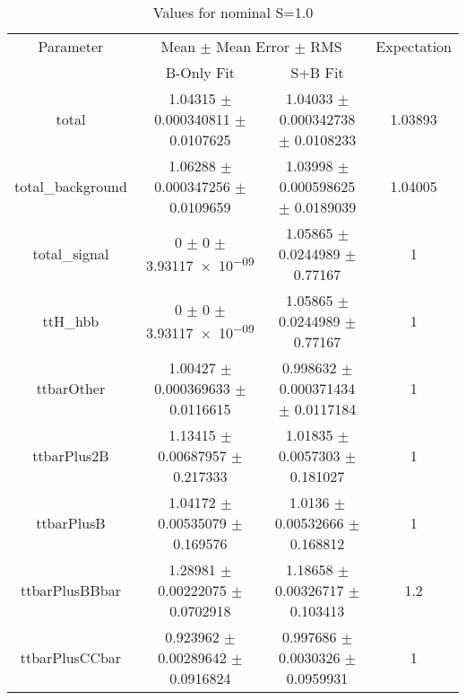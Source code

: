 \begin{table}
\centering
\caption{Values for nominal S=1.0}
\begin{tabular}{cccc}
\toprule
Parameter & \multicolumn{2}{c}{Mean $\pm$ Mean Error $\pm$ RMS} & Expectation\\
 & B-Only Fit & S+B Fit & \\
\midrule
total & \num{1.04315} $\pm$ \num{0.000340811} $\pm$ \num{0.0107625} & \num{1.04033} $\pm$ \num{0.000342738} $\pm$ \num{0.0108233} & \num{1.03893}\\
total\_background & \num{1.06288} $\pm$ \num{0.000347256} $\pm$ \num{0.0109659} & \num{1.03998} $\pm$ \num{0.000598625} $\pm$ \num{0.0189039} & \num{1.04005}\\
total\_signal & \num{0} $\pm$ \num{0} $\pm$ \num{3.93117e-09} & \num{1.05865} $\pm$ \num{0.0244989} $\pm$ \num{0.77167} & \num{1}\\
ttH\_hbb & \num{0} $\pm$ \num{0} $\pm$ \num{3.93117e-09} & \num{1.05865} $\pm$ \num{0.0244989} $\pm$ \num{0.77167} & \num{1}\\
ttbarOther & \num{1.00427} $\pm$ \num{0.000369633} $\pm$ \num{0.0116615} & \num{0.998632} $\pm$ \num{0.000371434} $\pm$ \num{0.0117184} & \num{1}\\
ttbarPlus2B & \num{1.13415} $\pm$ \num{0.00687957} $\pm$ \num{0.217333} & \num{1.01835} $\pm$ \num{0.0057303} $\pm$ \num{0.181027} & \num{1}\\
ttbarPlusB & \num{1.04172} $\pm$ \num{0.00535079} $\pm$ \num{0.169576} & \num{1.0136} $\pm$ \num{0.00532666} $\pm$ \num{0.168812} & \num{1}\\
ttbarPlusBBbar & \num{1.28981} $\pm$ \num{0.00222075} $\pm$ \num{0.0702918} & \num{1.18658} $\pm$ \num{0.00326717} $\pm$ \num{0.103413} & \num{1.2}\\
ttbarPlusCCbar & \num{0.923962} $\pm$ \num{0.00289642} $\pm$ \num{0.0916824} & \num{0.997686} $\pm$ \num{0.0030326} $\pm$ \num{0.0959931} & \num{1}\\
\bottomrule
\end{tabular}
\end{table}